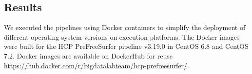 \documentclass[a4paper,num-refs]{oup-contemporary}
\begin{document}
%



\subsection{Results}

We executed the pipelines using Docker containers to simplify the 
deployment of different operating system versions on execution 
platforms. The Docker images were built for the HCP PreFreeSurfer 
pipeline v3.19.0 in 
CentOS 6.8 and CentOS 7.2. Docker images are available on DockerHub for 
reuse \url{https://hub.docker.com/r/bigdatalabteam/hcp-prefreesurfer/}. 
\end{document}

